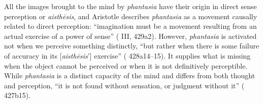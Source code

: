 All the images brought to the mind by \textit{phantasia} have their origin in direct sense perception or \textit{aisthēsis}, and Aristotle describes \textit{phantasia} as a movement causally related to direct perception: ``imagination must be a movement resulting from an actual exercise of a power of sense'' (\cite{aristotle2014soul} III, 429a2). However, \textit{phantasia} is activated not when we perceive something distinctly, ``but rather when there is some failure of accuracy in its [\textit{aisthēsis}'] exercise'' (\cite{aristotle2014soul} 428a14--15). It supplies what is missing when the object cannot be perceived or when it is not definitively perceptible. While \textit{phantasia} is a distinct capacity of the mind and differs from both thought and perception, ``it is not found without sensation, or judgment without it'' (\cite{aristotle2014soul} 427b15).

